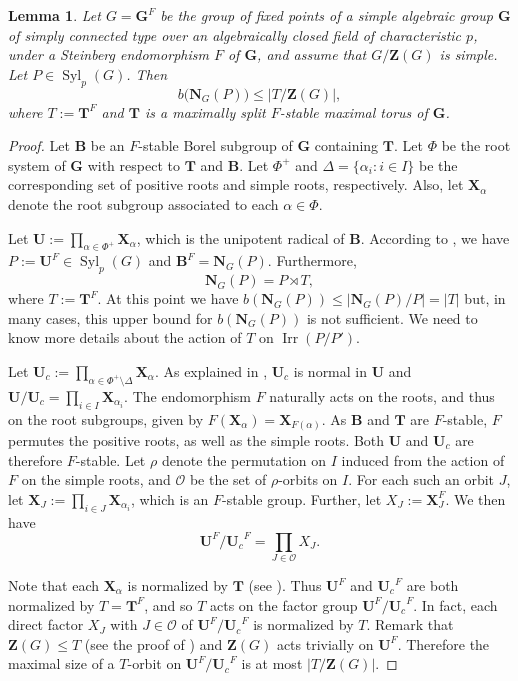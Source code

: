 \documentclass[12pt]{amsart}
\theoremstyle{plain}
\newtheorem{lem}[thm]{Lemma}
\theoremstyle{definition}
\numberwithin{equation}{section}
\newcommand{\Syl}{\operatorname{Syl}}
\newcommand{\Irr}{\operatorname{Irr}}
\newcommand{\FF}{\mathbb{F}}
\newcommand{\bG}{\mathbf{G}}
\newcommand{\bN}{\mathbf{N}}
\newcommand{\bT}{\mathbf{T}}
\newcommand{\bB}{{\mathbf{B}}}
\newcommand{\bU}{{\mathbf{U}}}
\newcommand{\bZ}{{\mathbf{Z}}}
\newcommand{\bX}{{\mathbf{X}}}
\begin{document}
\begin{lem}\label{lem:11}
Let $G = \bG^F$ be the group of fixed points of a simple algebraic
group $\bG$ of simply connected type over an algebraically closed
field of characteristic $p$, under a Steinberg endomorphism $F$ of
$\bG$, and assume that $G/\bZ(G)$ is simple. Let $P \in \Syl_p(G)$.
Then
\[
b\bigl(\bN_G(P)\bigr) \leq |T/\bZ(G)|,
\]
where $T := \bT^F$ and $\bT$ is a maximally split $F$-stable maximal
torus of $\bG$.
\end{lem}

\begin{proof}
Let $\bB$ be an $F$-stable Borel subgroup of $\bG$ containing $\bT$.
Let $\Phi$ be the root system of $\bG$ with respect to $\bT$ and
$\bB$. Let $\Phi^+$ and $\Delta=\{\alpha_i:i\in I\}$ be the
corresponding set of positive roots and simple roots, respectively.
Also, let $\bX_\alpha$ denote the root subgroup associated to each
$\alpha\in\Phi$.


Let $\bU:=\prod_{\alpha\in \Phi^+}\bX_{\alpha}$, which is the
unipotent radical of $\bB$. According to
\cite[Corollary~24.11]{MT11}, we have $P:=\bU^F\in\Syl_p(G)$ and
$\bB^F=\bN_G(P)$. Furthermore, \[\bN_G(P)=P\rtimes T,\] where
$T:=\bT^F$. At this point we have $b(\bN_G(P))\leq |\bN_G(P)/P|=|T|$
but, in many cases, this upper bound for $b(\bN_G(P))$ is not
sufficient. We need to know more details about the action of $T$ on
$\Irr(P/P')$.



Let $\bU_c:=\prod_{\alpha\in \Phi^+\setminus\Delta} \bX_{\alpha}$.
As explained in \cite[\S2.9]{Carter85}, $\bU_c$ is normal in $\bU$
and $\bU/\bU_c=\prod_{i\in I}\bX_{\alpha_i}$. The endomorphism $F$
naturally acts on the roots, and thus on the root subgroups, given
by $F(\bX_\alpha)=\bX_{F(\alpha)}$. As $\bB$ and $\bT$ are
$F$-stable, $F$ permutes the positive roots, as well as the simple
roots. Both $\bU$ and $\bU_c$ are therefore $F$-stable. Let $\rho$
denote the permutation on $I$ induced from the action of $F$ on the
simple roots, and $\mathcal{O}$ be the set of $\rho$-orbits on $I$.
For each such an orbit $J$, let $\bX_J:=\prod_{i\in J}
\bX_{\alpha_i}$, which is an $F$-stable group. Further, let
$X_J:=\bX_J^F$. We then have
\begin{equation}\label{eq:1}\bU^F/{\bU_c}^F= \prod_{J\in \mathcal{O}}
X_J.\end{equation}



Note that each $\bX_\alpha$ is normalized by $\bT$ (see
\cite[p.~18]{Carter85}). Thus $\bU^F$ and ${\bU_c}^F$ are both
normalized by $T=\bT^F$, and so $T$ acts on the factor group
$\bU^F/{\bU_c}^F$. In fact, each direct factor $X_J$ with $J\in
\mathcal{O}$ of $\bU^F/{\bU_c}^F$ is normalized by $T$. %
Remark that $\bZ(G)\leq T$ (see the proof of
\cite[Lemma~24.12]{MT11}) and $\bZ(G)$ acts trivially on $\bU^F$.
Therefore the maximal size of a $T$-orbit on $\bU^F/{\bU_c}^F$ is at
most $|T/\bZ(G)|$.



\end{proof}
\end{document}
